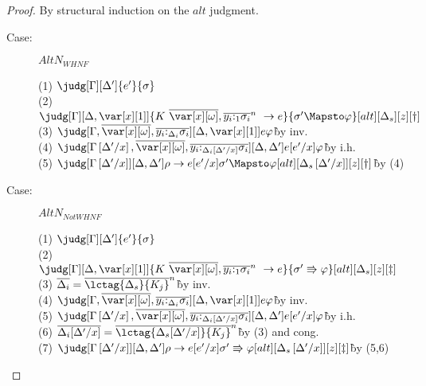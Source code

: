 \linearsubstaltslemma*

\begin{proof}
By structural induction on the $alt$ judgment.

\begin{description}
\item[Case:] $AltN_{WHNF}$
\begin{tabbing}
    (1) $\judg[\G][\D']{e'}{\s}$\\
    (2) $\judg[\G][\D,\xl]{\konstructor~\to e}{\s' \Mapsto \vp}[alt][\D_s][z][\dag]$\\
    (3) $\judg[\G,\ov{\xo},\ov{y_i{:}_{\D_i}\s_i}][\D,\xl]{e}{\vp}$\`by inv.\\
    (4) $\judg[\subst{\G}{\D'}{x},\ov{\xo},\ov{y_i{:}_{\subst{\D_i}{\D'}{x}}\s_i}][\D,\D']{e[e'/x]}{\vp}$\` by i.h.\\
    (5) $\judg[\subst{\G}{\D'}{x}][\D,\D']{\rho \to e[e'/x]}{\s' \Mapsto \vp}[alt][\subst{\D_s}{\D'}{x}][z][\dag]$\` by (4)\\
\end{tabbing}

\item[Case:] $AltN_{Not WHNF}$
\begin{tabbing}
    (1) $\judg[\G][\D']{e'}{\s}$\\
    (2) $\judg[\G][\D,\xl]{\konstructor~\to e}{\s' \Rrightarrow \vp}[alt][\D_s][z][\ddag]$\\
    (3) $\ov{\D_i}=\ov{\lctag{\D_s}{K_j}}^n$\`by inv.\\
    (4) $\judg[\G,\ov{\xo},\ov{y_i{:}_{\D_i}\s_i}][\D,\xl]{e}{\vp}$\`by inv.\\
    (5) $\judg[\subst{\G}{\D'}{x},\ov{\xo},\ov{y_i{:}_{\subst{\D_i}{\D'}{x}}\s_i}][\D,\D']{e[e'/x]}{\vp}$\` by i.h.\\
    (6) $\ov{\D_i[\D'/x]}=\ov{\lctag{\D_s[\D'/x]}{K_j}}^n$\`by (3) and cong.\\
    (7) $\judg[\subst{\G}{\D'}{x}][\D,\D']{\rho \to e[e'/x]}{\s' \Rrightarrow \vp}[alt][\subst{\D_s}{\D'}{x}][z][\ddag]$\` by (5,6)\\
\end{tabbing}


\end{description}
\end{proof}
